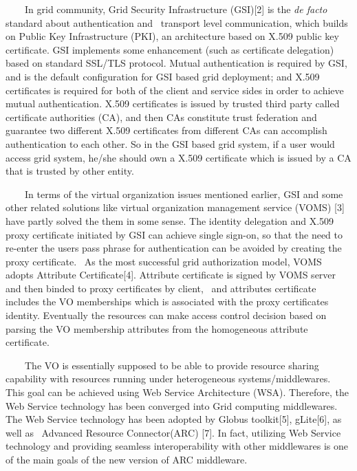 \documentclass{article}
\begin{document}
\ \ \ \ In grid community, Grid Security Infrastructure (GSI)[2] is the
\textit{de facto} standard about authentication and \ transport level
communication, which builds on Public Key Infrastructure (PKI), an
architecture based on X.509 public key certificate. GSI implements some
enhancement (such as certificate delegation) based on standard SSL/TLS
protocol. Mutual authentication is required by GSI, and is the default
configuration for GSI based grid deployment; and X.509 certificates is
required for both of the client and service sides in order to achieve
mutual authentication. X.509 certificates is issued by trusted third
party called certificate authorities (CA), and then CAs constitute
trust federation and guarantee two different X.509 certificates from
different CAs can accomplish authentication to each other. So in the
GSI based grid system, if a user would access grid system, he/she
should own a X.509 certificate which is issued by a CA that is trusted
by other entity.

\ \ \ \ In terms of the virtual organization issues mentioned earlier,
GSI and some other related solutions like virtual organization
management service (VOMS) [3] have partly solved the them in some
sense. The identity delegation and X.509 proxy certificate initiated by
GSI can achieve single sign-on, so that the need to re-enter the
user{\textquotesingle}s pass phrase for authentication can be avoided
by creating the proxy certificate. \ As the most successful grid
authorization model, VOMS adopts Attribute Certificate[4]. Attribute
certificate is signed by VOMS server and then binded to proxy
certificates by client, \ and attributes certificate includes the VO
memberships which is associated with the proxy
certificate{\textquotesingle}s identity. Eventually the resources can
make access control decision based on parsing the VO membership
attributes from the homogeneous attribute certificate. 

\ \ \ \ The VO is essentially supposed to be able to provide resource
sharing capability with resources running under heterogeneous
systems/middlewares. This goal can be achieved using Web Service
Architecture (WSA). Therefore, the Web Service technology has been
converged into Grid computing middlewares. The Web Service technology
has been adopted by Globus toolkit[5], gLite[6], as well as \ Advanced
Resource Connector(ARC) [7]. In fact, utilizing Web Service technology
and providing seamless interoperability with other middlewares is one
of the main goals of the new version of ARC middleware.
\end{document}
